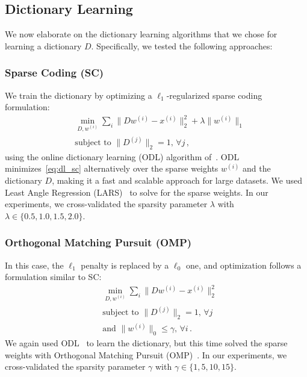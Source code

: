 \documentclass[svgnames]{scrartcl}
\begin{document}
\subsection{Dictionary Learning}
\label{ssec:dl}

We now elaborate on the dictionary learning algorithms that we chose for learning a dictionary $D$. Specifically, we tested the following approaches:

\subsubsection{Sparse Coding (SC)} 

We train the dictionary by optimizing a $\ell_1$-regularized sparse coding formulation:
\begin{align}
\label{eq:dl_sc}
& \min_{D, w^{(i)}} \sum_{i} \| D w^{(i)} - x^{(i)} \|_2^2 + \lambda \| w^{(i)} \|_1 \\
& \text{subject to } \|D^{(j)}\|_2 = 1, \, \forall j  \nonumber \, ,
\end{align}
using the online dictionary learning (ODL) algorithm of~\citet{mairal2009online}. ODL minimizes~\eqref{eq:dl_sc} alternatively over the sparse weights $w^{(i)}$ and the dictionary $D$, making it a fast and scalable approach for large datasets. We used Least Angle Regression (LARS)~\citep{efron2004least} to solve for the sparse weights. In our experiments, we cross-validated the sparsity parameter $\lambda$ with $\lambda \in \{0.5, 1.0, 1.5, 2.0\}$.


\subsubsection{Orthogonal Matching Pursuit (OMP)}

In this case, the $\ell_1$ penalty is replaced by a $\ell_0$ one, and optimization follows a formulation similar to SC:
\begin{align}
\label{eq:dl_omp}
& \min_{D, w^{(i)}} \sum_{i} \| D w^{(i)} - x^{(i)} \|_2^2 \\
& \text{subject to } \|D^{(j)}\|_2 = 1, \, \forall j  \nonumber \\
& \text{and }  \| w^{(i)} \|_0 \leq \gamma, \, \forall i \, . \nonumber
\end{align}
We again used ODL~\citep{mairal2009online} to learn the dictionary, but this time solved the sparse weights with Orthogonal Matching Pursuit (OMP)~\citep{pati1993orthogonal}. In our experiments, we cross-validated the sparsity parameter $\gamma$ with $\gamma \in \{1, 5, 10, 15\}$.
\end{document}
